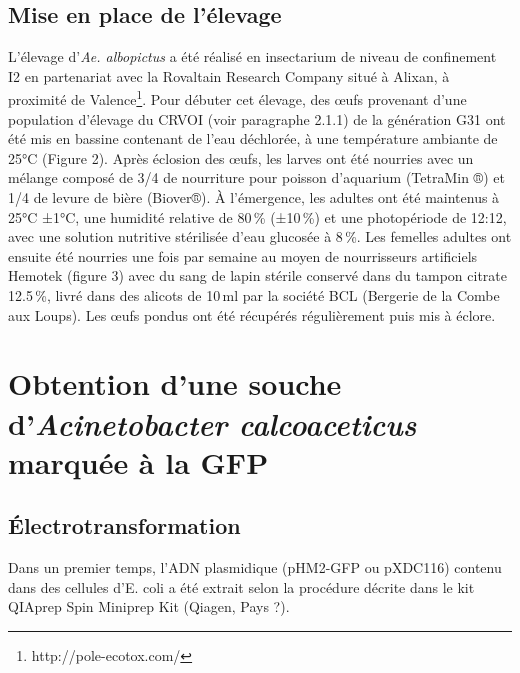 \subsection{Mise en place de l'élevage}

L’élevage d'\textit{Ae. albopictus} a été réalisé en insectarium de niveau de confinement I2 en partenariat avec la Rovaltain Research Company situé à Alixan, à proximité de Valence\footnote{http://pole-ecotox.com/}. Pour débuter cet élevage, des œufs provenant d’une population d’élevage du CRVOI (voir paragraphe 2.1.1) de la génération G31 ont été mis en bassine contenant de l'eau déchlorée, à une température ambiante de 25°C (Figure 2). 
Après éclosion des œufs, les larves ont été nourries avec un mélange composé de 3/4 de nourriture pour poisson d'aquarium (TetraMin ®) et 1/4 de levure de bière (Biover®).
À l'émergence, les adultes ont été maintenus à 25°C ±1°C, une humidité relative de 80\,\% (±10\,\%) et une photopériode de 12:12, avec une solution nutritive stérilisée d'eau glucosée à 8\,\%. Les femelles adultes ont ensuite été nourries une fois par semaine au moyen de nourrisseurs artificiels Hemotek (figure 3) avec du sang de lapin stérile conservé dans du tampon citrate 12.5\,\%, livré dans des alicots de 10\,ml par la société BCL (Bergerie de la Combe aux Loups).
Les œufs pondus ont été récupérés régulièrement puis mis à éclore.

\section{Obtention d'une souche d'\textit{Acinetobacter calcoaceticus} marquée à la GFP}

\subsection{Électrotransformation}

Dans un premier temps, l’ADN plasmidique (pHM2-GFP ou pXDC116) contenu dans des cellules d’E. coli a été extrait selon la procédure décrite dans le kit QIAprep Spin Miniprep Kit (Qiagen, Pays ?).

